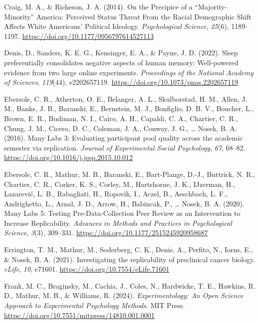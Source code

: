 \documentclass[
  english,
  a4paper,
]{article}
\newlength{\cslhangindent}
\newenvironment{CSLReferences}[2] %
{\begin{list}{}{%
			\setlength{\itemindent}{0pt}
			\setlength{\leftmargin}{0pt}
			\setlength{\parsep}{0pt}
			\ifodd #1
			\setlength{\leftmargin}{\cslhangindent}
			\setlength{\itemindent}{-1\cslhangindent}
			\fi
			\setlength{\itemsep}{#2\baselineskip}}}
	{\end{list}}
\begin{document}
\begin{CSLReferences}{1}{0}
Craig, M. A., \& Richeson, J. A. (2014). On the {Precipice} of a {``{Majority-Minority}''} {America}: {Perceived Status Threat From} the {Racial Demographic Shift Affects White Americans}' {Political Ideology}. \emph{Psychological Science}, \emph{25}(6), 1189--1197. \url{https://doi.org/10.1177/0956797614527113}

Denis, D., Sanders, K. E. G., Kensinger, E. A., \& Payne, J. D. (2022). Sleep preferentially consolidates negative aspects of human memory: {Well-powered} evidence from two large online experiments. \emph{Proceedings of the National Academy of Sciences}, \emph{119}(44), e2202657119. \url{https://doi.org/10.1073/pnas.2202657119}

Ebersole, C. R., Atherton, O. E., Belanger, A. L., Skulborstad, H. M., Allen, J. M., Banks, J. B., Baranski, E., Bernstein, M. J., Bonfiglio, D. B. V., Boucher, L., Brown, E. R., Budiman, N. I., Cairo, A. H., Capaldi, C. A., Chartier, C. R., Chung, J. M., Cicero, D. C., Coleman, J. A., Conway, J. G., \ldots{} Nosek, B. A. (2016). Many {Labs} 3: {Evaluating} participant pool quality across the academic semester via replication. \emph{Journal of Experimental Social Psychology}, \emph{67}, 68--82. \url{https://doi.org/10.1016/j.jesp.2015.10.012}

Ebersole, C. R., Mathur, M. B., Baranski, E., Bart-Plange, D.-J., Buttrick, N. R., Chartier, C. R., Corker, K. S., Corley, M., Hartshorne, J. K., IJzerman, H., Lazarević, L. B., Rabagliati, H., Ropovik, I., Aczel, B., Aeschbach, L. F., Andrighetto, L., Arnal, J. D., Arrow, H., Babincak, P., \ldots{} Nosek, B. A. (2020). Many {Labs} 5: {Testing Pre-Data-Collection Peer Review} as an {Intervention} to {Increase Replicability}. \emph{Advances in Methods and Practices in Psychological Science}, \emph{3}(3), 309--331. \url{https://doi.org/10.1177/2515245920958687}

Errington, T. M., Mathur, M., Soderberg, C. K., Denis, A., Perfito, N., Iorns, E., \& Nosek, B. A. (2021). Investigating the replicability of preclinical cancer biology. \emph{eLife}, \emph{10}, e71601. \url{https://doi.org/10.7554/eLife.71601}

Frank, M. C., Braginsky, M., Cachia, J., Coles, N., Hardwicke, T. E., Hawkins, R. D., Mathur, M. B., \& Williams, R. (2024). \emph{Experimentology: {An} {Open} {Science} {Approach} to {Experimental} {Psychology} {Methods}}. MIT Press. \url{https://doi.org/10.7551/mitpress/14810.001.0001}


\end{CSLReferences}
\end{document}
